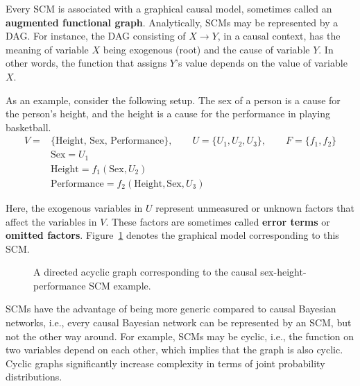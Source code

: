 \documentclass{article}
\begin{document}
\noindent Every SCM is associated with a graphical causal model, sometimes called an \textbf{augmented functional graph}. Analytically, SCMs may be represented by a DAG. For instance, the DAG consisting of $X \rightarrow Y$, in a causal context, has the meaning of variable $X$ being exogenous (root) and the cause of variable $Y$. In other words, the function that assigns $Y$'s value depends on the value of variable $X$. 

As an example, consider the following setup. The sex of a person is a cause for the person's height, and the height is a cause for the performance in playing basketball. 
\begin{align*}
    V = &\{\text{Height, Sex, Performance}\}, \qquad U = \{U_1, U_2, U_3\}, \qquad F = \{f_1, f_2\}\\
    &\text{Sex} = U_1\\
    &\text{Height} = f_1(\text{Sex}, U_2)\\
    &\text{Performance} = f_2(\text{Height}, \text{Sex}, U_3)
\end{align*}

\noindent Here, the exogenous variables in $U$ represent unmeasured or unknown factors that affect the variables in $V$. These factors are sometimes called \textbf{error terms} or \textbf{omitted factors}. Figure~\ref{fig:scm} denotes the graphical model corresponding to this SCM. 

\begin{figure}[H]
    \centering
    \caption{A directed acyclic graph corresponding to the causal sex-height-performance SCM example.}
    \label{fig:scm}
\end{figure}

\noindent SCMs have the advantage of being more generic compared to causal Bayesian networks, i.e., every causal Bayesian network can be represented by an SCM, but not the other way around. For example, SCMs may be cyclic, i.e., the function on two variables depend on each other, which implies that the graph is also cyclic. Cyclic graphs significantly increase complexity in terms of joint probability distributions. 
\end{document}
